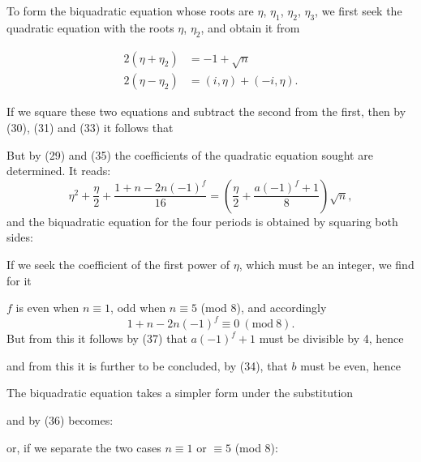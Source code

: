 
To form the biquadratic equation whose roots are $\eta$,
$\eta_1$, $\eta_2$, $\eta_3$, we first seek the quadratic equation
with the roots $\eta$, $\eta_2$, and obtain it from

\[
\begin{aligned}
2(\eta+\eta_2)&=-1+\sqrt{n}\\
2(\eta-\eta_2)&=(i,\eta)+(-i,\eta).
\end{aligned}
\]

If we square these two equations and subtract the
second from the first, then by (30), (31) and (33) it follows that


But by (29) and (35) the coefficients of the quadratic
equation sought are determined. It reads:
\[
\eta^2+\frac{\eta}{2}+\frac{1+n-2n(-1)^f}{16}=\left(\frac{\eta}{2}+\frac{a(-1)^f+1}{8}\right)\sqrt{n},
\]
and the biquadratic equation for the four periods is obtained
by squaring both sides:


If we seek the coefficient of the first power of $\eta$, which
must be an integer, we find for it


$f$ is even when $n\equiv 1$, odd when $n\equiv 5$ (mod 8),
and accordingly
\[
1+n-2n(-1)^f\equiv 0\ (\mathrm{mod}\ 8).
\]
But from this it follows by (37) that $a(-1)^f+1$ must be
divisible by 4, hence


and from this it is further to be concluded, by (34), that $b$ must
be even, hence


The biquadratic equation takes a simpler form under the substitution


and by (36) becomes:


or, if we separate the two cases $n\equiv 1$ or $\equiv 5$ (mod 8):

